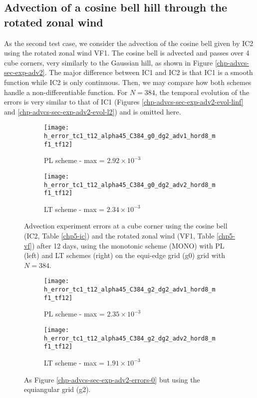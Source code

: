 \subsection{Advection of a cosine bell hill through the rotated zonal wind}
As the second test case, we consider the advection of the cosine bell given by IC2 using the rotated zonal wind VF1.
The cosine bell is advected and passes over 4 cube corners, very similarly to the Gaussian hill, as shown in Figure \ref{chp-advcs-sec-exp-adv2}.
The major difference between IC1 and IC2 is that IC1 is a smooth function while IC2 is only continuous.
Then, we may compare how both schemes handle a non-differentiable function.
For $N=384$, the temporal evolution of the errors is very similar to that of IC1
(Figures \ref{chp-advcs-sec-exp-adv2-evol-linf} and \ref{chp-advcs-sec-exp-adv2-evol-l2}) and is omitted here.
\begin{figure}[!htb]
	\centering
	\begin{subfigure}{0.35\textwidth}
		\centering
		\texttt{[image: h\_error\_tc1\_t12\_alpha45\_C384\_g0\_dg2\_adv1\_hord8\_mf1\_tf12]}
		\caption{PL scheme - max = $2.92 \times 10^{-3}$\label{chp-advcs-sec-exp-adv5-errors-0a}}
	\end{subfigure}
	\begin{subfigure}{0.35\textwidth}
		\centering
		\texttt{[image: h\_error\_tc1\_t12\_alpha45\_C384\_g0\_dg2\_adv2\_hord8\_mf1\_tf12]}
		\caption{LT scheme - max = $2.34\times 10^{-3}$\label{chp-advcs-sec-exp-adv5-errors-0b}}
	\end{subfigure}
	\caption{
		Advection experiment errors at a cube corner using the cosine bell (IC2, Table \ref{chp5-ic}) and  
the rotated zonal wind (VF1, Table \ref{chp5-vf}) after 12 days, using the monotonic scheme (MONO) 
		with PL (left) and LT schemes (right) on the equi-edge grid (g0) grid with $N=384$. 
		\label{chp-advcs-sec-exp-adv5-errors-0}}
\end{figure}
\begin{figure}[!htb]
	\centering
	\begin{subfigure}{0.35\textwidth}
		\centering
		\texttt{[image: h\_error\_tc1\_t12\_alpha45\_C384\_g2\_dg2\_adv1\_hord8\_mf1\_tf12]}
		\caption{PL scheme - max = $2.35\times 10^{-3}$\label{chp-advcs-sec-exp-adv5-errors-2a}}
	\end{subfigure}
	\begin{subfigure}{0.35\textwidth}
		\centering
		\texttt{[image: h\_error\_tc1\_t12\_alpha45\_C384\_g2\_dg2\_adv2\_hord8\_mf1\_tf12]}
		\caption{LT scheme - max = $1.91\times 10^{-3}$ \label{chp-advcs-sec-exp-adv5-errors-2b}}
	\end{subfigure}
	\caption{As Figure \ref{chp-advcs-sec-exp-adv2-errors-0} but using the equiangular grid (g2).\label{chp-advcs-sec-exp-adv5-errors-2}}
\end{figure}


